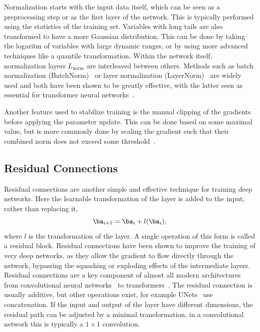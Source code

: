 Normalization starts with the input data itself, which can be seen as a preprocessing step or as the first layer of the network.
This is typically performed using the statistics of the training set.
Variables with long tails are also transformed to have a more Gaussian distribution.
This can be done by taking the logaritm of variables with large dynamic ranges, or by using more advanced techniques like a quantile transformation.
Within the network itself, normalization layers $L_{\text{norm}}$ are interleaved between others.
Methods such as batch normalization (BatchNorm)~\cite{BatchNorm} or layer normalization (LayerNorm)~\cite{LayerNorm} are widely used and both have been shown to be greatly effective, with the latter seen as essential for transformer neural networks~\cite{Attention}.

Another feature used to stabilize training is the manual clipping of the gradients before applying the parameter update.
This can be done based on some maximal value, but is more commonly done by scaling the gradient such that their combined norm does not exceed some threshold~\cite{WhyGradientClipping}.

\subsection{Residual Connections}

Residual connections are another simple and effective technique for training deep networks.
Here the learnable transformation of the layer is added to the input, rather than replacing it,
\begin{equation}
    \ba_{i+1} = \ba_i + l(\ba_i),
\end{equation}
where $l$ is the transformation of the layer.
A single operation of this form is called a residual block.
Residual connections have been shown to improve the training of very deep networks, as they allow the gradient to flow directly through the network, bypassing the squashing or exploding effects of the intermediate layers.
Residual connections are a key component of almost all modern architectures from convolutional neural networks~\cite{ResNet} to transformers~\cite{Attention}.
The residual connection is usually additive, but other operations exist, for example UNets~\cite{UNet} use concatenation.
If the input and output of the layer have different dimensions, the residual path can be adjusted by a minimal transformation, in a convolutional network this is typically a $1 \times 1$ convolution.

